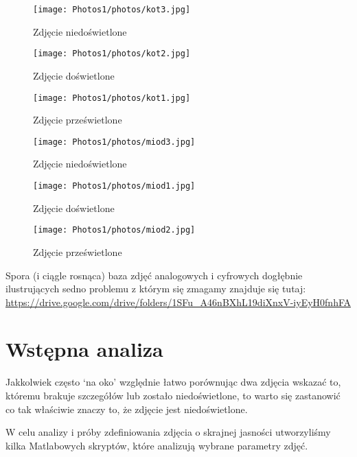 \documentclass[]{mwart}
\begin{document}
\begin{figure}[H]
    \centering
    \texttt{[image: Photos1/photos/kot3.jpg]}
    \caption{Zdjęcie niedoświetlone}
\end{figure}
\begin{figure}[H]
    \centering
    \texttt{[image: Photos1/photos/kot2.jpg]}
    \caption{Zdjęcie doświetlone}
\end{figure}
\begin{figure}[H]
    \centering
    \texttt{[image: Photos1/photos/kot1.jpg]}
    \caption{Zdjęcie prześwietlone}
\end{figure}

\begin{figure}[H]
    \centering
    \texttt{[image: Photos1/photos/miod3.jpg]}
    \caption{Zdjęcie niedoświetlone}
\end{figure}
\begin{figure}[H]
    \centering
    \texttt{[image: Photos1/photos/miod1.jpg]}
    \caption{Zdjęcie doświetlone}
\end{figure}
\begin{figure}[H]
    \centering
    \texttt{[image: Photos1/photos/miod2.jpg]}
    \caption{Zdjęcie prześwietlone}
\end{figure}


Spora (i ciągle rosnąca) baza zdjęć analogowych i cyfrowych dogłębnie ilustrujących
sedno problemu z którym się zmagamy znajduje się tutaj:
\url{https://drive.google.com/drive/folders/1SFu_A46nBXhL19diXnxV-iyEyH0fnhFA}








\section{Wstępna analiza}
Jakkolwiek często `na oko' względnie łatwo porównując dwa zdjęcia wskazać
to, któremu brakuje szczegółów lub zostało niedoświetlone, to warto się
zastanowić co tak właściwie znaczy to, że zdjęcie jest niedoświetlone. \newline

W celu analizy i próby zdefiniowania zdjęcia o skrajnej jasności
utworzyliśmy kilka Matlabowych skryptów, które analizują wybrane
parametry zdjęć. \newline
\end{document}
